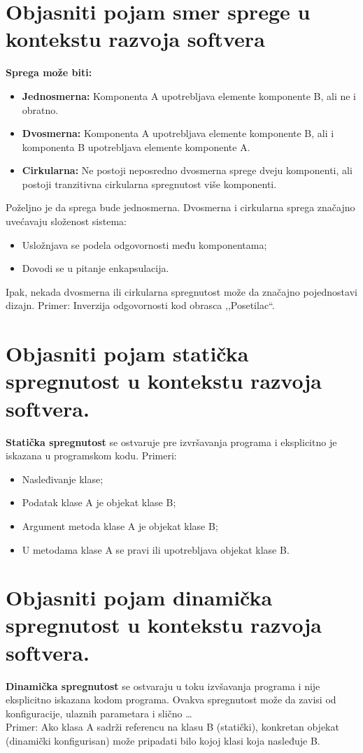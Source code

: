 \documentclass[a4paper]{article}
\begin{document}
\section{Objasniti pojam smer sprege u kontekstu razvoja softvera}
  \noindent \textbf{Sprega može biti:}
  \begin{itemize}
    \item \textbf{Jednosmerna:} Komponenta A upotrebljava elemente komponente B, ali ne i
          obratno.
    \item \textbf{Dvosmerna:} Komponenta A upotrebljava elemente komponente B, ali i komponenta B
          upotrebljava elemente komponente A.
    \item \textbf{Cirkularna:} Ne postoji neposredno dvosmerna sprege dveju komponenti, ali 
          postoji tranzitivna cirkularna spregnutost više komponenti.
  \end{itemize}
  Poželjno je da sprega bude jednosmerna. Dvosmerna i cirkularna sprega značajno uvećavaju složenost
  sistema:
  \begin{itemize}
    \item Usložnjava se podela odgovornosti među komponentama;
    \item Dovodi se u pitanje enkapsulacija.
  \end{itemize}
  Ipak, nekada dvosmerna ili cirkularna spregnutost može da značajno pojednostavi dizajn. Primer: Inverzija odgovornosti kod obrasca ,,Posetilac``.
  
\section{Objasniti pojam statička spregnutost u kontekstu razvoja softvera.}
  \textbf{Statička spregnutost} se ostvaruje pre izvršavanja programa i eksplicitno je iskazana
  u programskom kodu. Primeri:
  \begin{itemize}
    \item Nasleđivanje klase;
    \item Podatak klase A je objekat klase B;
    \item Argument metoda klase A je objekat klase B;
    \item U metodama klase A se pravi ili upotrebljava objekat klase B.
  \end{itemize}

\section{Objasniti pojam dinamička spregnutost u kontekstu razvoja softvera.}
  \textbf{Dinamička spregnutost} se ostvaraju u toku izvšavanja programa i nije eksplicitno
  iskazana kodom programa. Ovakva spregnutost može da zavisi od konfiguracije, ulaznih parametara
  i slično \dots \\ 
  \indent Primer: Ako klasa A sadrži referencu na klasu B (statički), konkretan objekat 
  (dinamički konfigurisan) može pripadati bilo kojoj klasi koja nasleđuje B.
\end{document}

